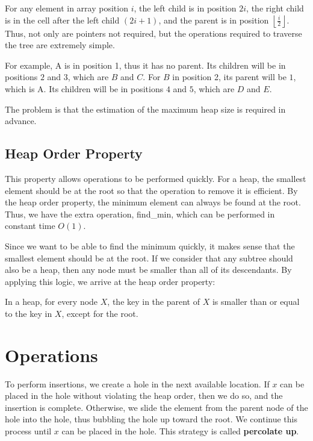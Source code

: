 For any element in array position \(i\), the left child is in position \(2i\), the right child is in the cell after the left child \((2i + 1)\), and the parent is in position \(\left\lfloor \frac{i}{2} \right\rfloor\). Thus, not only are pointers not required, but the operations required to traverse the tree are extremely simple.  

For example, A is in position 1, thus it has no parent. Its children will be in positions \( 2 \) and \( 3 \), which are \( B \) and \( C \). For \( B \) in position 2, its parent will be \( 1 \), which is A. Its children will be in positions \( 4 \) and \( 5 \), which are \( D \) and \( E \).  

The problem is that the estimation of the maximum heap size is required in advance.  

\subsection{Heap Order Property}
This property allows operations to be performed quickly. For a heap, the smallest element should be at the root so that the operation to remove it is efficient. By the heap order property, the minimum element can always be found at the root. Thus, we have the extra operation, find\_min, which can be performed in constant time \(O(1)\).

Since we want to be able to find the minimum quickly, it makes sense that the smallest element should be at the root. If we consider that any subtree should also be a heap, then any node must be smaller than all of its descendants. By applying this logic, we arrive at the heap order property:

In a heap, for every node \(X\), the key in the parent of \(X\) is smaller than or equal to the key in \(X\), except for the root.

\section{Operations}
To perform insertions, we create a hole in the next available location. If \(x\) can be placed in the hole without violating the heap order, then we do so, and the insertion is complete. Otherwise, we slide the element from the parent node of the hole into the hole, thus bubbling the hole up toward the root. We continue this process until \(x\) can be placed in the hole. This strategy is called \textbf{percolate up}.

